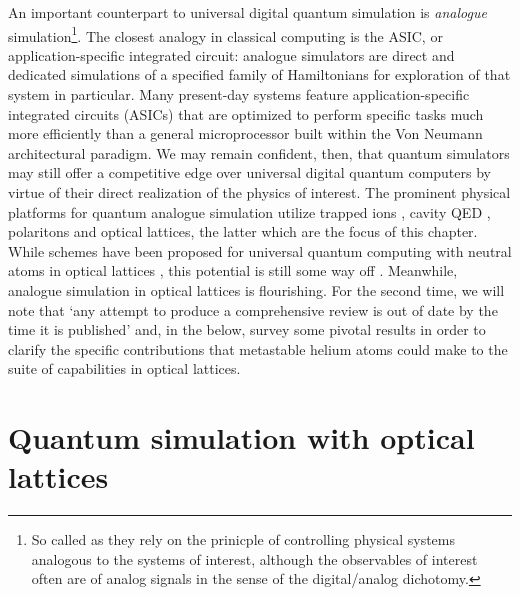 	An important counterpart to universal digital quantum simulation is \emph{analogue} simulation\footnote{So called as they rely on the prinicple of controlling physical systems analogous to the systems of interest, although the observables of interest often are of analog signals in the sense of the digital/analog dichotomy.}.
	The closest analogy in classical computing is the ASIC, or application-specific integrated circuit: analogue simulators are direct and dedicated simulations of a specified family of Hamiltonians for exploration of that system in particular.
	Many present-day systems feature application-specific integrated circuits (ASICs) that are optimized to perform specific tasks much more efficiently than a general microprocessor built within the Von Neumann architectural paradigm.
	We may remain confident, then, that quantum simulators may still offer a competitive edge over universal digital quantum computers by virtue of their direct realization of the physics of interest.
	The prominent physical platforms for quantum analogue simulation utilize trapped ions \cite{}, cavity QED \cite{}, polaritons \cite{} and optical lattices, the latter which are the focus of this chapter.
	While schemes have been proposed for universal quantum computing with neutral atoms in optical lattices \cite{Brennen99,Henriet20}, this potential is still some way off \cite{Markov00}.
	Meanwhile, analogue simulation in optical lattices is flourishing.
	For the second time, we will note that `any attempt to produce a comprehensive review is out of date by the time it is published' and, in the below, survey some pivotal results in order to clarify the specific contributions that metastable helium atoms could make to the suite of capabilities in optical lattices.
	



\section{Quantum simulation with optical lattices}

